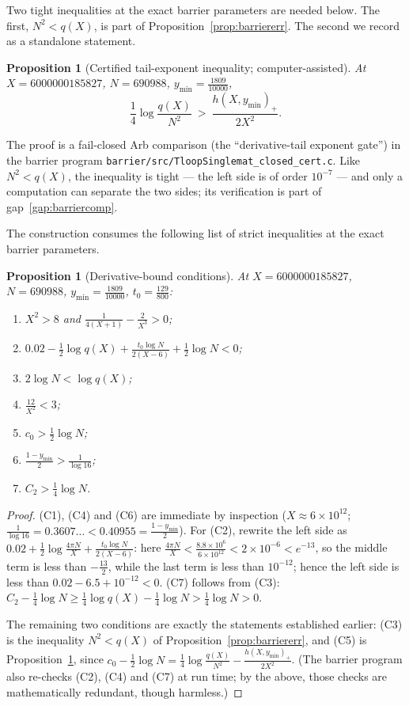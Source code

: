 \documentclass[11pt]{article}
\newtheorem{proposition}[theorem]{Proposition}
\theoremstyle{definition}
\begin{document}
Two tight inequalities at the exact barrier parameters are needed
below. The first, $N^2<q(X)$, is part of
Proposition~\ref{prop:barriererr}. The second we record as a
standalone statement.

\begin{proposition}[Certified tail-exponent inequality;
computer-assisted]\label{prop:tailexp}
At $X=6000000185827$, $N=690988$, $y_{\min}=\frac{1809}{10000}$,
\[
\frac14\log\frac{q(X)}{N^2}\ >\ \frac{h(X,y_{\min})_+}{2X^2} .
\]
\end{proposition}

The proof is a fail-closed Arb comparison (the ``derivative-tail
exponent gate'') in the barrier program
\texttt{barrier/src/TloopSinglemat\_closed\_cert.c}. Like
$N^2<q(X)$, the inequality is tight --- the left side is of order
$10^{-7}$ --- and only a computation can separate the two sides;
its verification is part of gap~\ref{gap:barriercomp}.

The construction consumes the following list of strict inequalities
at the exact barrier parameters.

\begin{proposition}[Derivative-bound conditions]\label{prop:derivgates}
At $X=6000000185827$, $N=690988$, $y_{\min}=\frac{1809}{10000}$,
$t_0=\frac{129}{800}$:
\begin{enumerate}
\item[\textup{(C1)}] $X^2>8$ and
$\frac1{4(X+1)}-\frac2{X^3}>0$;
\item[\textup{(C2)}] $0.02-\frac12\log q(X)
+\frac{t_0\log N}{2(X-6)}+\frac12\log N<0$;
\item[\textup{(C3)}] $2\log N<\log q(X)$;
\item[\textup{(C4)}] $\frac{12}{X^2}<3$;
\item[\textup{(C5)}] $c_0>\frac12\log N$;
\item[\textup{(C6)}] $\frac{1-y_{\min}}2>\frac1{\log16}$;
\item[\textup{(C7)}] $C_2>\frac14\log N$.
\end{enumerate}
\end{proposition}

\begin{proof}
(C1), (C4) and (C6) are immediate by inspection
($X\approx6\times10^{12}$;
$\frac1{\log16}=0.3607\ldots<0.40955=\frac{1-y_{\min}}2$). For
(C2), rewrite the left side as
$0.02+\frac12\log\frac{4\pi N}{X}
+\frac{t_0\log N}{2(X-6)}$: here
$\frac{4\pi N}{X}<\frac{8.8\times10^6}{6\times10^{12}}
<2\times10^{-6}<e^{-13}$, so the middle term is less than
$-\frac{13}2$, while the last term is less than $10^{-12}$; hence
the left side is less than $0.02-6.5+10^{-12}<0$. (C7) follows
from (C3): $C_2-\frac14\log N\ge\frac14\log q(X)-\frac14\log N
>\frac14\log N>0$.

The remaining two conditions are exactly the statements
established earlier: (C3) is the inequality $N^2<q(X)$ of
Proposition~\ref{prop:barriererr}, and (C5) is
Proposition~\ref{prop:tailexp}, since
$c_0-\frac12\log N
=\frac14\log\frac{q(X)}{N^2}-\frac{h(X,y_{\min})_+}{2X^2}$.
(The barrier program also re-checks (C2), (C4) and (C7) at run
time; by the above, those checks are mathematically redundant,
though harmless.)
\end{proof}
\end{document}
